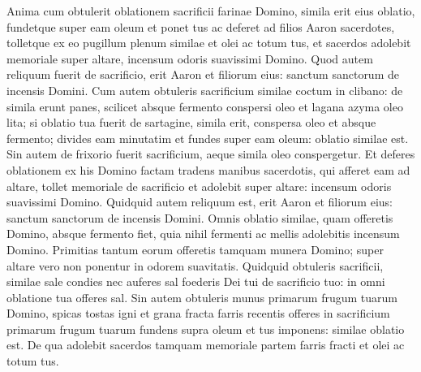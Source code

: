 \begin{biblechapter}
\begin{biblechapter}
\verse Anima cum obtulerit oblationem sacrificii farinae Domino, simila erit eius oblatio, fundetque super eam oleum et ponet tus 
\verse ac deferet ad filios Aaron sacerdotes, tolletque ex eo pugillum plenum similae et olei ac totum tus, et sacerdos adolebit memoriale super altare, incensum odoris suavissimi Domino. 
\verse Quod autem reliquum fuerit de sacrificio, erit Aaron et filiorum eius: sanctum sanctorum de incensis Domini.
 \verse Cum autem obtuleris sacrificium similae coctum in clibano: de simila erunt panes, scilicet absque fermento conspersi oleo et lagana azyma oleo lita; 
\verse si oblatio tua fuerit de sartagine, simila erit, conspersa oleo et absque fermento; 
\verse divides eam minutatim et fundes super eam oleum: oblatio similae est. 
 \verse Sin autem de frixorio fuerit sacrificium, aeque simila oleo conspergetur. 
 \verse Et deferes oblationem ex his Domino factam tradens manibus sacerdotis, 
\verse qui afferet eam ad altare, tollet memoriale de sacrificio et adolebit super altare: incensum odoris suavissimi Domino. 
\verse Quidquid autem reliquum est, erit Aaron et filiorum eius: sanctum sanctorum de incensis Domini.
 \verse Omnis oblatio similae, quam offeretis Domino, absque fermento fiet, quia nihil fermenti ac mellis adolebitis incensum Domino. 
\verse Primitias tantum eorum offeretis tamquam munera Domino; super altare vero non ponentur in odorem suavitatis.
 \verse Quidquid obtuleris sacrificii, similae sale condies nec auferes sal foederis Dei tui de sacrificio tuo: in omni oblatione tua offeres sal.
 \verse Sin autem obtuleris munus primarum frugum tuarum Domino, spicas tostas igni et grana fracta farris recentis offeres in sacrificium primarum frugum tuarum 
 \verse fundens supra oleum et tus imponens: similae oblatio est. 
\verse De qua adolebit sacerdos tamquam memoriale partem farris fracti et olei ac totum tus.
 

\end{biblechapter}
\end{biblechapter}
